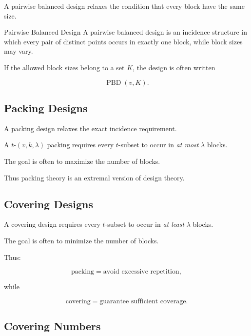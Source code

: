 A pairwise balanced design relaxes the condition that every block have
the same size.

\begin{definitionbox}{Pairwise Balanced Design}
A pairwise balanced design is an incidence structure in which every pair
of distinct points occurs in exactly one block, while block sizes may
vary.
\end{definitionbox}

If the allowed block sizes belong to a set \(K\), the design is often
written

\[
\boxed{
\operatorname{PBD}(v,K).
}
\]

\subsection{Packing Designs}
\label{subsec:packing-designs}

A packing design relaxes the exact incidence requirement.

A \(t\)-\((v,k,\lambda)\) packing requires every \(t\)-subset to occur in
\emph{at most} \(\lambda\) blocks.

The goal is often to maximize the number of blocks.

Thus packing theory is an extremal version of design theory.

\subsection{Covering Designs}
\label{subsec:covering-designs}

A covering design requires every \(t\)-subset to occur in
\emph{at least} \(\lambda\) blocks.

The goal is often to minimize the number of blocks.

Thus:

\[
\boxed{
\text{packing}
=
\text{avoid excessive repetition},
}
\]

while

\[
\boxed{
\text{covering}
=
\text{guarantee sufficient coverage}.
}
\]

\subsection{Covering Numbers}
\label{subsec:covering-numbers}


